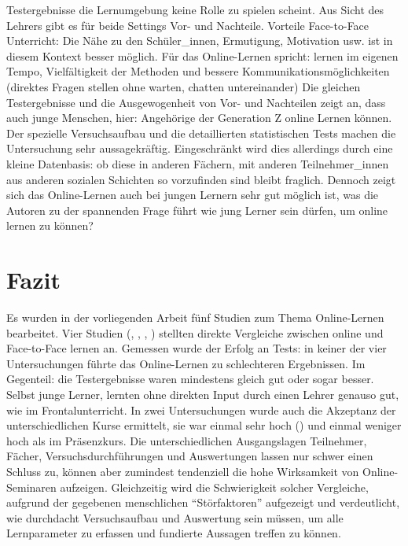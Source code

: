 Testergebnisse die Lernumgebung keine Rolle zu spielen scheint. Aus
Sicht des Lehrers gibt es für beide Settings Vor- und Nachteile.
Vorteile Face-to-Face Unterricht: Die Nähe zu den Schüler\_innen,
Ermutigung, Motivation usw. ist in diesem Kontext besser möglich. Für
das Online-Lernen spricht: lernen im eigenen Tempo, Vielfältigkeit der
Methoden und bessere Kommunikationsmöglichkeiten (direktes Fragen
stellen ohne warten, chatten untereinander) Die gleichen Testergebnisse
und die Ausgewogenheit von Vor- und Nachteilen zeigt an, dass auch junge
Menschen, hier: Angehörige der Generation Z online Lernen können. Der
spezielle Versuchsaufbau und die detaillierten statistischen Tests
machen die Untersuchung sehr aussagekräftig. Eingeschränkt wird dies
allerdings durch eine kleine Datenbasis: ob diese in anderen Fächern,
mit anderen Teilnehmer\_innen aus anderen sozialen Schichten so
vorzufinden sind bleibt fraglich. Dennoch zeigt sich das Online-Lernen
auch bei jungen Lernern sehr gut möglich ist, was die Autoren zu der
spannenden Frage führt wie jung Lerner sein dürfen, um online lernen zu
können?

\section{Fazit}\label{fazit}

Es wurden in der vorliegenden Arbeit fünf Studien zum Thema
Online-Lernen bearbeitet. Vier Studien
(\cite{hohenberg2009erfolgreiches}, \cite{Fischer2014a},
\cite{mentzer2007two}, \cite{Edwards2013}) stellten direkte Vergleiche
zwischen online und Face-to-Face lernen an. Gemessen wurde der Erfolg an
Tests: in keiner der vier Untersuchungen führte das Online-Lernen zu
schlechteren Ergebnissen. Im Gegenteil: die Testergebnisse waren
mindestens gleich gut oder sogar besser. Selbst junge Lerner, lernten
ohne direkten Input durch einen Lehrer genauso gut, wie im
Frontalunterricht. In zwei Untersuchungen wurde auch die Akzeptanz der
unterschiedlichen Kurse ermittelt, sie war einmal sehr hoch
(\cite{Nistor2005a}) und einmal weniger hoch \cite{mentzer2007two} als
im Präsenzkurs. Die unterschiedlichen Ausgangslagen Teilnehmer, Fächer,
Versuchsdurchführungen und Auswertungen lassen nur schwer einen Schluss
zu, können aber zumindest tendenziell die hohe Wirksamkeit von
Online-Seminaren aufzeigen. Gleichzeitig wird die Schwierigkeit solcher
Vergleiche, aufgrund der gegebenen menschlichen ``Störfaktoren''
aufgezeigt und verdeutlicht, wie durchdacht Versuchsaufbau und
Auswertung sein müssen, um alle Lernparameter zu erfassen und fundierte
Aussagen treffen zu können.
